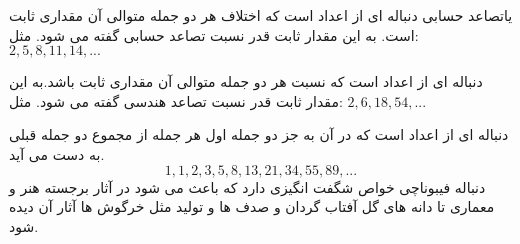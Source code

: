 \p
\begin{definition}
    \p
    یاتصاعد حسابی دنباله ای از اعداد است که اختلاف هر دو جمله متوالی آن مقداری ثابت است. به این مقدار ثابت قدر نسبت تصاعد حسابی گفته می شود.
    مثل:
    $2, 5, 8, 11, 14, ...$
\end{definition}
\p




\p
\begin{definition}
    \p
   دنباله ای از اعداد است که نسبت هر دو جمله متوالی آن مقداری ثابت باشد.به این مقدار ثابت قدر نسبت تصاعد هندسی گفته می شود.
    مثل:
  $2, 6, 18, 54, ...$  
\end{definition}
\p




\p
\begin{definition}
    \p
    دنباله ای از اعداد است که در آن به جز دو جمله اول هر جمله از مجموع دو جمله قبلی به دست می آید.
    \p
  $$1, 1, 2, 3, 5, 8, 13, 21, 34, 55, 89, ...$$
	\p
  دنباله فیبوناچی خواص شگفت انگیزی دارد که باعث می شود در آثار برجسته هنر و معماری تا دانه های گل آفتاب گردان و صدف ها و تولید مثل خرگوش ها آثار آن دیده شود. 
\end{definition}
